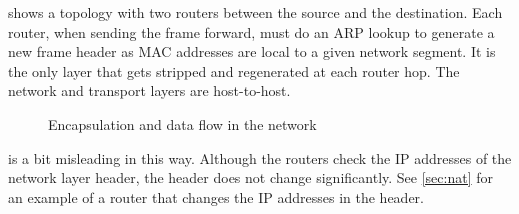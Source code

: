 { shows a topology with two routers between the source and the destination.
Each router, when sending the frame forward, must do an \acs{ARP} lookup to generate a new frame header as \acs{MAC} addresses are local to a given network segment.
It is the only layer that gets stripped and regenerated at each router hop.
The network and transport layers are host-to-host.


\begin{figure}
\centering

\caption{Encapsulation and data flow in the network}
\label{fig:data-flow}
\end{figure}


 is a bit misleading in this way.
Although the routers check the \acs{IP} addresses of the network layer header, the header does not change significantly.
See \vref{sec:nat} for an example of a router that changes the \acs{IP} addresses in the header.
}

\label{sec:network-icons}

